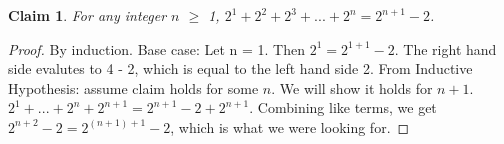 \documentclass{article}
\newtheorem*{claim}{Claim}
\begin{document}
\begin{claim}
  For any integer $n$ \(\geq\) 1, \(2^1+2^2+2^3+ ... +2^n = 2^{n+1}-2\).
\end{claim}
 
\begin{proof}
By induction. Base case: Let n = 1. Then \(2^1=2^{1+1}-2\). The right hand side evalutes 
  to 4 - 2, which is equal to the left hand side 2. From Inductive Hypothesis: 
  assume claim holds for some $n$. We will show it holds for \(n+1\).
  \(2^1+...+2^n+2^{n+1} = 2^{n+1}-2+2^{n+1}\). Combining like terms, we get
  \(2^{n+2}-2 = 2^{(n+1)+1} - 2\), which is what we were looking for.

\end{proof}
\end{document}
